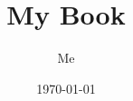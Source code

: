 \documentclass{book}
\begin{document}
\frontmatter
\title{My Book}
\author{Me}
\date{\today}
\maketitle

\tableofcontents

\mainmatter




\backmatter
\end{document}
